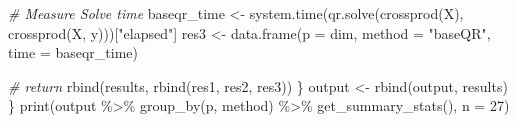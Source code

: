 \documentclass[]{tufte-handout}
\newenvironment{Shaded}{}{}
\newcommand{\AttributeTok}[1]{\textcolor[rgb]{0.49,0.56,0.16}{#1}}
\newcommand{\CommentTok}[1]{\textcolor[rgb]{0.38,0.63,0.69}{\textit{#1}}}
\newcommand{\DecValTok}[1]{\textcolor[rgb]{0.25,0.63,0.44}{#1}}
\newcommand{\FunctionTok}[1]{\textcolor[rgb]{0.02,0.16,0.49}{#1}}
\newcommand{\NormalTok}[1]{#1}
\newcommand{\OtherTok}[1]{\textcolor[rgb]{0.00,0.44,0.13}{#1}}
\newcommand{\SpecialCharTok}[1]{\textcolor[rgb]{0.25,0.44,0.63}{#1}}
\newcommand{\StringTok}[1]{\textcolor[rgb]{0.25,0.44,0.63}{#1}}
\begin{document}
\begin{Shaded}
\begin{Highlighting}[]
    \CommentTok{\# Measure Solve time}
\NormalTok{    baseqr\_time }\OtherTok{\textless{}{-}} \FunctionTok{system.time}\NormalTok{(}\FunctionTok{qr.solve}\NormalTok{(}\FunctionTok{crossprod}\NormalTok{(X), }\FunctionTok{crossprod}\NormalTok{(X, y)))[}\StringTok{"elapsed"}\NormalTok{]}
\NormalTok{    res3        }\OtherTok{\textless{}{-}} \FunctionTok{data.frame}\NormalTok{(}\AttributeTok{p =}\NormalTok{ dim, }\AttributeTok{method =} \StringTok{"baseQR"}\NormalTok{,  }\AttributeTok{time =}\NormalTok{ baseqr\_time)}
    
    \CommentTok{\# return}
    \FunctionTok{rbind}\NormalTok{(results, }\FunctionTok{rbind}\NormalTok{(res1, res2, res3))}
\NormalTok{  \}}
\NormalTok{  output }\OtherTok{\textless{}{-}} \FunctionTok{rbind}\NormalTok{(output, results)}
\NormalTok{\}}
\FunctionTok{print}\NormalTok{(output }\SpecialCharTok{\%\textgreater{}\%}
        \FunctionTok{group\_by}\NormalTok{(p, method) }\SpecialCharTok{\%\textgreater{}\%}
        \FunctionTok{get\_summary\_stats}\NormalTok{(), }\AttributeTok{n =} \DecValTok{27}\NormalTok{)}
\end{Highlighting}
\end{Shaded}
\end{document}
